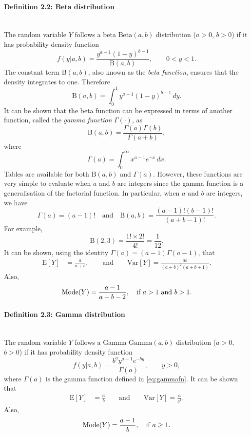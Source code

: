\paragraph{Definition 2.2: Beta distribution}{~\\
The random variable $Y$ follows a beta $\mathrm{Beta}(a,b)$ distribution ($a>0$,
\label{def:beta}
$b>0$) if it has probability density function
\begin{equation}
f(y|a,b)=\frac{y^{a-1}(1-y)^{b-1}}{\mathrm{B}(a,b)},\quad\quad 0<y<1.
\label{eq:betapdf}
\end{equation}
The constant term $\mathrm{B}(a,b)$, also known as the {\it beta function},
ensures that the density integrates to one. Therefore
\begin{equation}
\mathrm{B}(a,b)=\int_0^1
y^{a-1}(1-y)^{b-1}\,dy.
\label{eq:betafn}
\end{equation}
It can be shown that the beta function can be expressed in terms of another function, called the {\it gamma function} $\Gamma(\cdot)$, as
$$
\mathrm{B}(a,b) =\frac{\Gamma(a)\Gamma(b)}{\Gamma(a+b)},
$$
where
\begin{equation}
\label{eq:gammafn}
\Gamma(a)=\int_0^\infty x^{a-1}e^{-x}\,dx.
\end{equation}
Tables are available for both $\mathrm{B}(a,b)$ and $\Gamma(a)$. However, these functions are very simple to evaluate when $a$ and $b$ are integers since the gamma function is a generalisation of the factorial function. In particular, when $a$ and $b$ are integers, we have
$$
\Gamma(a)=(a-1)!\quad\text{and}\quad 
\mathrm{B}(a,b)=\frac{(a-1)!(b-1)!}{(a+b-1)!}.
$$
For example,
\begin{equation*}
\mathrm{B}(2,3)=\frac{1!\times2!}{4!}=\frac{1}{12}.
\end{equation*}
It can be shown, using the identity $\Gamma(a)=(a-1)\Gamma(a-1)$, that
\begin{align*}
\text{E}[Y]&=\frac{a}{a+b},\quad\quad\text{and}\quad\quad 
\text{Var}[Y]=\frac{ab}{(a+b)^2(a+b+1)}. 
\end{align*}
Also,
$$\textnormal{Mode}(Y)=\frac{a-1}{a+b-2}, \quad\text{if $a>1$ and $b>1$}.$$}
\clearpage
\paragraph{Definition 2.3: Gamma distribution}{~\\
  The random variable $Y$ follows a Gamma $\mathrm{Gamma}(a,b)$ distribution
  ($a>0$, $b>0$) if it has probability density function
$$f(y|a,b) =\frac{b^ay^{a-1}e^{-by}}{\Gamma(a)},\quad\quad y>0,$$ where $\Gamma(a)$ is the gamma function defined in
\eqref{eq:gammafn}. It can be shown that
\begin{align*}
\text{E}[Y]&=\frac{a}{b}\quad\quad\text{and}\quad\quad 
\text{Var}[Y]=\frac{a}{b^2}. 
\end{align*}
Also,
$$\textnormal{Mode}(Y)=\frac{a-1}{b}, \quad\text{if $a\geq 1$}.
$$}

